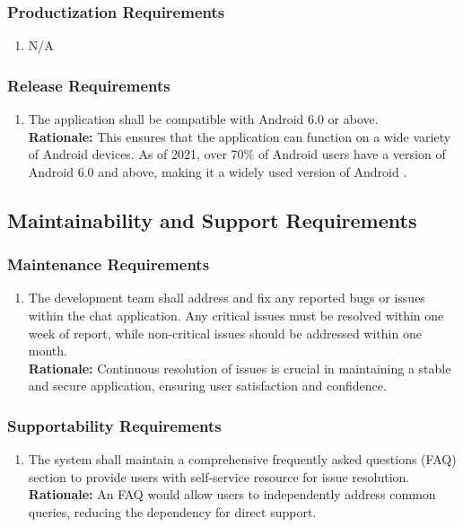 \documentclass[]{article}
\begin{document}
\subsubsection{Productization Requirements}
\label{ssub:productization_requirements}
\begin{enumerate}[{OE-P}1. ]
	\item N/A
\end{enumerate}
\subsubsection{Release Requirements}
\label{ssub:release_requirements}
\begin{enumerate}[{OE-R}1. ]
	\item The application shall be compatible with Android 6.0 or above. \\
	      {\bf Rationale:} This ensures that the application can function on a wide variety of Android devices.
	      As of 2021, over 70\% of Android users have a version of Android 6.0 and above, making it a widely
	      used version of Android \cite{8c}.
\end{enumerate}


\subsection{Maintainability and Support Requirements}
\label{sub:maintainability_and_support_requirements}
\subsubsection{Maintenance Requirements}
\label{ssub:maintenance_requirements}
\begin{enumerate}[{MS-M}1. ]
	\item The development team shall address and fix any reported bugs or issues within the chat application.
	      Any critical issues must be resolved within one week of report, while non-critical issues should be addressed within one month. \\
	      {\bf Rationale:} Continuous resolution of issues is crucial in maintaining a stable and secure application,
	      ensuring user satisfaction and confidence.
\end{enumerate}
\subsubsection{Supportability Requirements}
\label{ssub:supportability_requirements}
\begin{enumerate}[{MS-S}1. ]
	\item The system shall maintain a comprehensive frequently asked questions (FAQ) section to provide users with self-service
	      resource for issue resolution. \\
	      {\bf Rationale:} An FAQ would allow users to independently address common queries, reducing the dependency for direct
	      support.
\end{enumerate}
\end{document}

